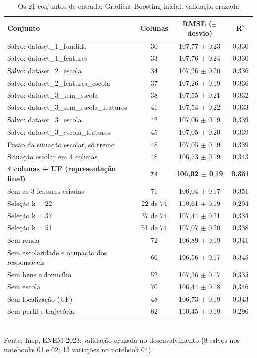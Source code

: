 \documentclass[conference,a4paper]{IEEEtran}
\begin{document}
\begin{table}[!t]
\caption{Os 21 conjuntos de entrada: Gradient Boosting inicial, validação cruzada}
\centering\footnotesize
\begin{tabularx}{\textwidth}{>{\raggedright\arraybackslash}Xccc}
\toprule
\textbf{Conjunto} & \textbf{Colunas} & \textbf{RMSE ($\pm$ desvio)} & \textbf{R$^2$} \\
\midrule
Salvo: dataset\_1\_fundido & 30 & 107,77 $\pm$ 0,23 & 0,330 \\
Salvo: dataset\_1\_features & 33 & 107,76 $\pm$ 0,24 & 0,330 \\
Salvo: dataset\_2\_escola & 34 & 107,26 $\pm$ 0,20 & 0,336 \\
Salvo: dataset\_2\_features\_escola & 37 & 107,26 $\pm$ 0,19 & 0,336 \\
Salvo: dataset\_3\_sem\_escola & 38 & 107,55 $\pm$ 0,21 & 0,332 \\
Salvo: dataset\_3\_sem\_escola\_features & 41 & 107,54 $\pm$ 0,22 & 0,333 \\
Salvo: dataset\_3\_escola & 42 & 107,06 $\pm$ 0,19 & 0,339 \\
Salvo: dataset\_3\_escola\_features & 45 & 107,05 $\pm$ 0,20 & 0,339 \\
Fusão da situação escolar, só treino & 48 & 107,05 $\pm$ 0,19 & 0,339 \\
Situação escolar em 4 colunas & 48 & 106,73 $\pm$ 0,19 & 0,343 \\
\textbf{4 colunas + UF (representação final)} & \textbf{74} & \textbf{106,02 $\pm$ 0,19} & \textbf{0,351} \\
Sem as 3 features criadas & 71 & 106,04 $\pm$ 0,17 & 0,351 \\
Seleção k = 22 & 22 de 74 & 110,61 $\pm$ 0,19 & 0,294 \\
Seleção k = 37 & 37 de 74 & 107,44 $\pm$ 0,21 & 0,334 \\
Seleção k = 51 & 51 de 74 & 107,07 $\pm$ 0,20 & 0,338 \\
Sem renda & 72 & 106,89 $\pm$ 0,19 & 0,341 \\
Sem escolaridade e ocupação dos responsáveis & 66 & 106,56 $\pm$ 0,17 & 0,345 \\
Sem bens e domicílio & 52 & 107,36 $\pm$ 0,17 & 0,335 \\
Sem escola & 70 & 106,44 $\pm$ 0,18 & 0,346 \\
Sem localização (UF) & 48 & 106,73 $\pm$ 0,19 & 0,343 \\
Sem perfil e trajetória & 62 & 110,45 $\pm$ 0,19 & 0,296 \\
\bottomrule
\end{tabularx}
\\[2pt]{\scriptsize Fonte: Inep, ENEM 2023; validação cruzada no desenvolvimento (8 salvos nos notebooks 01 e 02; 13 variações no notebook 04).}
\end{table}
\end{document}
